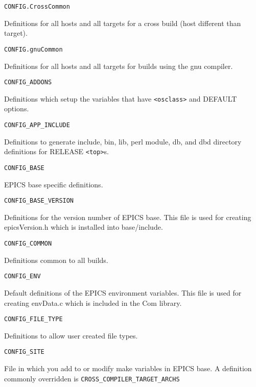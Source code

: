 \begin{description}

\item {}\verb|CONFIG.CrossCommon|

Definitions for all hosts and all targets for a cross build (host different than target).

\item {}\verb|CONFIG.gnuCommon|

Definitions for all hosts and all targets for builds using the gnu compiler.

\item {}\verb|CONFIG_ADDONS|

Definitions which setup the variables that have \verb|<osclass>| and DEFAULT options.

\item {}\verb|CONFIG_APP_INCLUDE|

Definitions to generate include, bin, lib, perl module, db, and dbd directory definitions for RELEASE \verb|<top>|s.

\item {}\verb|CONFIG_BASE|

EPICS base specific definitions.

\item {}\verb|CONFIG_BASE_VERSION|

Definitions for the version number of EPICS base. This file is used for creating epicsVersion.h which is installed 
into base/include.

\item {}\verb|CONFIG_COMMON|

Definitions common to all builds.

\item {}\verb|CONFIG_ENV|

Default definitions of the EPICS environment variables. This file is used for creating envData.c which is included 
in the Com library.

\item {}\verb|CONFIG_FILE_TYPE|

Definitions to allow user created file types.

\item {}\verb|CONFIG_SITE|

File in which you add to or modify make variables in EPICS base. A definition commonly overridden is \verb|CROSS_COMPILER_TARGET_ARCHS|


\end{description}
